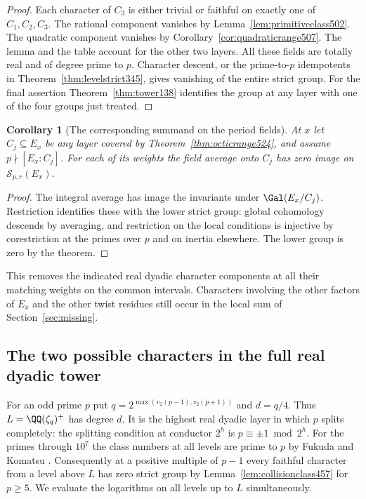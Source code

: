 \documentclass[a4paper,11pt]{article}
\newtheorem{corollary}[proposition]{Corollary}
\theoremstyle{definition}
\theoremstyle{remark}
\numberwithin{equation}{section}
\begin{document}
\begin{proof}
Each character of \(C_3\) is either trivial or faithful on exactly
one of \(C_1,C_2,C_3\). The rational component vanishes by
Lemma~\ref{lem:primitiveclass502}. The quadratic component vanishes
by Corollary~\ref{cor:quadraticrange507}. The lemma and the table
account for the other two layers. All these fields are totally real
and of degree prime to \(p\). Character descent, or the
prime-to-\(p\) idempotents in Theorem~\ref{thm:levelstrict345}, gives
vanishing of the entire strict group. For the final assertion
Theorem~\ref{thm:tower138} identifies the group at any layer with
one of the four groups just treated.
\end{proof}

\begin{corollary}[The corresponding summand on the period fields]
\leavevmode\label{cor:realperiod524}
At \(x\) let \(C_j\subseteq E_x\) be any layer covered by
Theorem~\ref{thm:octicrange524}, and assume \(p\nmid[E_x:C_j]\).
For each of its weights the field average onto \(C_j\) has zero
image on \(\mathcal S_{p,r}(E_x)\).
\end{corollary}
\begin{proof}
The integral average has image the invariants under
\(\Gal(E_x/C_j)\). Restriction identifies these with the lower
strict group: global cohomology descends by averaging, and restriction
on the local conditions is injective by corestriction at the primes
over \(p\) and on inertia elsewhere. The lower group is zero by the
theorem.
\end{proof}

This removes the indicated real dyadic character components at all
their matching weights on the common intervals. Characters involving
the other factors of \(E_x\) and the other twist residues still
occur in the local sum of Section~\ref{sec:missing}.


\subsection{The two possible characters in the full real dyadic tower}
\label{sec:dyadictower525}

For an odd prime \(p\) put \(q=2^{\max(v_2(p-1),v_2(p+1))}\) and
\(d=q/4\). Thus
\(L=\QQ(\zeta_q)^+\) has degree \(d\). It is the highest real dyadic
layer in which \(p\) splits completely: the splitting condition at
conductor \(2^h\) is \(p\equiv\pm1\bmod 2^h\). For the primes
through \(10^7\) the class numbers at all levels are prime to \(p\)
by Fukuda and Komatsu \cite[Corollary 1.1]{XI-VIII-weberFK524}. Consequently
at a positive multiple of \(p-1\) every faithful character from a
level above \(L\) has zero strict group by Lemma~\ref{lem:collisionclass457}
for \(p\ge5\). We evaluate the logarithms on all levels up to \(L\)
simultaneously.
\end{document}
